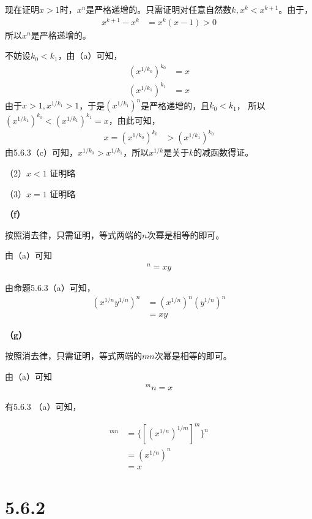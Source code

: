 \documentclass{article}
\theoremstyle{mystyle}
\begin{document}
现在证明$x>1$时，$x^n$是严格递增的。只需证明对任意自然数$k, x^k < x^{k+1}$。由于，
\begin{align*}
  x^{k+1} - x^k & = x^k(x-1) > 0
\end{align*}
所以$x^n$是严格递增的。

不妨设$k_0 < k_1$，由（a）可知，
\begin{align}
  (x^{1/k_0})^{k_0} & = x \\
  (x^{1/k_1})^{k_1} & = x
\end{align}
由于$x>1, x^{1/k_1} > 1$，于是$(x^{1/k_1})^n$是严格递增的，且$k_0<k_1$，
所以$(x^{1/k_1})^{k_0} < (x^{1/k_1})^{k_1}=x$，由此可知，
\begin{align}
  x = (x^{1/k_0})^{k_0} & > (x^{1/k_1})^{k_0}
\end{align}
由5.6.3（c）可知，$x^{1/k_0} > x^{1/k_1}$，所以$x^{1/k}$是关于$k$的减函数得证。

（2）$x<1$ 证明略

（3）$x=1$ 证明略

\textbf{（f）}

按照消去律，只需证明，等式两端的$n$次幂是相等的即可。

由（a）可知
\begin{align*}
  [(xy)^{1/n}]^n = xy
\end{align*}

由命题5.6.3（a）可知，
\begin{align*}
  (x^{1/n}y^{1/n})^n & = (x^{1/n})^n  (y^{1/n})^n \\
                     & = xy
\end{align*}

\textbf{（g）}

按照消去律，只需证明，等式两端的$mn$次幂是相等的即可。

由（a）可知
\begin{align*}
  [(x)^{1/mn}]^mn = x
\end{align*}

有5.6.3 （a）可知，

\begin{align*}
  [(x^{1/n})^{1/m}]^{mn} & = \{[(x^{1/n})^{1/m}]^m\}^n \\
                         & = (x^{1/n})^n               \\
                         & = x
\end{align*}

\section*{5.6.2}
\end{document}
